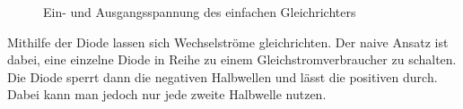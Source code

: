 \begin{figure}[H]
  \begin{center}
    \caption{Ein- und Ausgangsspannung des einfachen Gleichrichters}
    \label{img:simprectout}
  \end{center}
\end{figure}

Mithilfe der Diode lassen sich Wechselströme gleichrichten. Der naive Ansatz
ist dabei, eine einzelne Diode in Reihe zu einem Gleichstromverbraucher zu
schalten. Die Diode sperrt dann die negativen Halbwellen und lässt die
positiven durch. Dabei kann man jedoch nur jede zweite Halbwelle nutzen.

